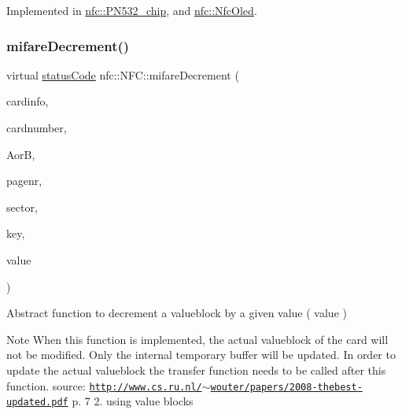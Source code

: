 Implemented in \hyperlink{classnfc_1_1PN532__chip_a9737b9cf574ec198bcc0f9f42f50d882}{nfc\+::\+P\+N532\+\_\+chip}, and \hyperlink{classnfc_1_1NfcOled_a1168a23f48bec44eae8d65a1625736e5}{nfc\+::\+Nfc\+Oled}.

\mbox{\label{classnfc_1_1NFC_a81f93853766cc9df5f061b95b6a41700}} 
\subsubsection{\texorpdfstring{mifare\+Decrement()}{mifareDecrement()}}
{\footnotesize\ttfamily virtual \hyperlink{declarations_8h_ae1d20c5a38cae82ccaa6a77be3fd264b}{status\+Code} nfc\+::\+N\+F\+C\+::mifare\+Decrement (\begin{DoxyParamCaption}\item[{\hyperlink{classcard}{card} \&}]{cardinfo,  }\item[{const uint8\+\_\+t}]{cardnumber,  }\item[{const \hyperlink{declarations_8h_a305b1a3bcfca65e2a82f0f9d24676835}{mifare\+Commands}}]{AorB,  }\item[{const uint8\+\_\+t}]{pagenr,  }\item[{const uint8\+\_\+t}]{sector,  }\item[{const uint8\+\_\+t $\ast$}]{key,  }\item[{const uint32\+\_\+t}]{value }\end{DoxyParamCaption})\hspace{0.3cm}{\ttfamily [pure virtual]}}



Abstract function to decrement a valueblock by a given value ( value ) 

\begin{DoxyNote}{Note}
When this function is implemented, the actual valueblock of the card will not be modified. Only the internal temporary buffer will be updated. In order to update the actual valueblock the transfer function needs to be called after this function. source\+: \href{http://www.cs.ru.nl/~wouter/papers/2008-thebest-updated.pdf}{\tt http\+://www.\+cs.\+ru.\+nl/$\sim$wouter/papers/2008-\/thebest-\/updated.\+pdf} p. 7 2. using value blocks
\end{DoxyNote}

